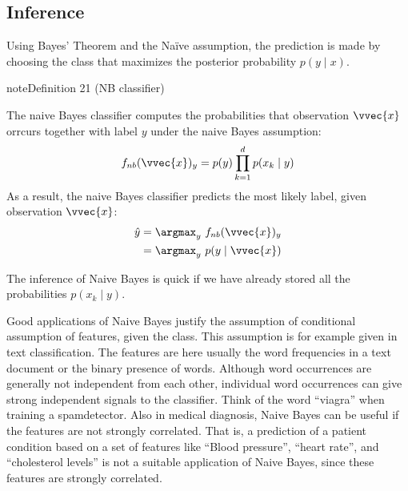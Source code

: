 \documentclass[letterpaper,10pt,english]{jupyterBook}
\begin{document}
\subsection{Inference}
\label{\detokenize{classification_naive_bayes:inference}}
\sphinxAtStartPar
Using Bayes’ Theorem and the Naïve assumption, the prediction is made by choosing the class  that maximizes the posterior probability \(p(y\mid x)\).
\label{classification_naive_bayes:definition-3}
\begin{sphinxadmonition}{note}{Definition 21 (NB classifier)}



\sphinxAtStartPar
The naive Bayes classifier computes the probabilities that observation \(\vvec{x}\) orrcurs together with label \(y\) under the naive Bayes assumption:
\begin{equation}\label{equation:classification_naive_bayes:f_nb}
\begin{split}f_{nb}(\vvec{x})_y = p(y)\prod_{k=1}^d p(x_k\mid y)\end{split}
\end{equation}
\sphinxAtStartPar
As a result, the naive Bayes classifier predicts the most likely label, given observation \(\vvec{x}\):
\begin{equation}\label{equation:classification_naive_bayes:yhat_nb}
\begin{split}\begin{align*}
\hat{y} & = \argmax_y\ f_{nb}(\vvec{x})_y\\
&= \argmax_y\ p(y\mid \vvec{x})
\end{align*}\end{split}
\end{equation}\end{sphinxadmonition}

\sphinxAtStartPar
The inference of Naive Bayes is quick if we have already stored all the probabilities \(p(x_k \mid y)\).

\sphinxAtStartPar
Good applications of Naive Bayes justify the assumption of conditional assumption of features, given the class. This assumption is for example given in text classification. The features are here usually the word frequencies in a text document or the binary presence of words. Although word occurrences are generally not independent from each other, individual word occurrences can give strong independent signals to the classifier. Think of the word “viagra” when training a spam\sphinxhyphen{}detector. Also in medical diagnosis, Naive Bayes can be useful if the features are not strongly correlated. That is, a prediction of a patient condition based on a set of features like “Blood pressure”, “heart rate”, and “cholesterol levels” is not a suitable application of Naive Bayes, since these features are strongly correlated.
\end{document}
